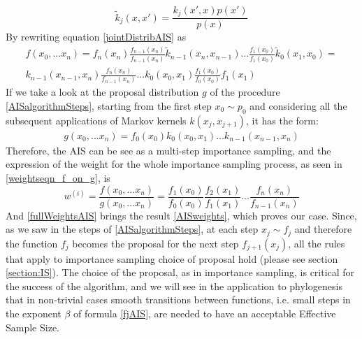 \documentclass[12pt,mythesisstyle]{report}
\begin{document}
\begin{equation}\label{detailedBalanceConditionAIS}
\tilde{k}_{j}(x,x')=\frac{k_{j}(x',x)p(x')}{p(x)}
\end{equation}
By rewriting equation \eqref{jointDistribAIS} as
\begin{equation}\label{jointDistribAISrewritten}
\begin{aligned}
f(x_0, ... x_n)=f_n(x_n)\frac{f_{n-1}(x_n)}{f_{n-1}(x_n)}\tilde{k}_{n-1}(x_n,x_{n-1})...\frac{f_{1}(x_0)}{f_{1}(x_0)}\tilde{k}_0(x_1,x_{0})=\\
k_{n-1}(x_{n-1},x_n)\frac{f_n(x_n)}{f_{n-1}(x_n)}...k_0(x_0,x_{1})\frac{f_{1}(x_0)}{f_{0}(x_0)}f_1(x_1)
\end{aligned}
\end{equation}
If we take a look at the proposal distribution $g$ of the procedure \eqref{AISalgorithmSteps}, starting from the first step $x_{0} \sim p_0$ and considering all the subsequent applications of Markov kernels $k(x_j,x_{j+1})$, it has the form:
\begin{equation}\label{jointproposalDistribAIS}
\begin{aligned}
g(x_0, ... x_n)=f_0(x_0)k_{0}(x_{0},x_1)...k_{n-1}(x_{n-1},x_{n})
\end{aligned}
\end{equation}
Therefore, the AIS can be see as a multi-step importance sampling, and the expression of the weight for the whole importance sampling process, as seen in \eqref{weightseqn_f_on_g}, is
\begin{equation}\label{fullWeightsAIS}
w^{(i)}=\frac{f(x_0, ... x_n)}{g(x_0, ... x_n)}=\frac{f_{1}(x_{0})}{f_{0}(x_{0})}\frac{f_{2}(x_{1})}{f_{1}(x_{1})}\text{...}\frac{f_{n}(x_{n})}{f_{n-1}(x_{n})}\end{equation}
And \eqref{fullWeightsAIS} brings the result \eqref{AISweights}, which proves our case.
Since, as we saw in the steps of \eqref{AISalgorithmSteps}, at each step $x_j \sim f_j$ and therefore the function $f_j$ becomes the proposal for the next step $f_{j+1}(x_j)$, all the rules that apply to importance sampling choice of proposal hold (please see section \ref{section:IS}). The choice of the proposal, as in importance sampling, is critical for the success of the algorithm, and we will see in the application to phylogenesis that in non-trivial cases smooth transitions between functions, i.e. small steps in the exponent $\beta$ of formula \eqref{fjAIS}, are needed to have an acceptable Effective Sample Size.
\end{document}
